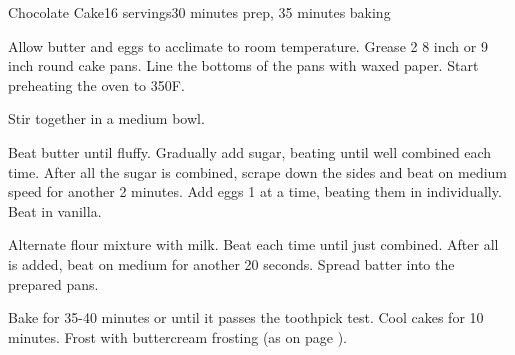 \documentclass[../Cookbook.tex]{subfiles}
\begin{document}
\begin{recipe}{Chocolate Cake}{16 servings}{30 minutes prep, 35 minutes baking}

Allow butter and eggs to acclimate to room temperature. Grease 2 8 inch or 9\X{} inch round cake pans. Line the bottoms of the pans with waxed paper. Start preheating the oven to 350\0F.

Stir together in a medium bowl.

Beat butter until fluffy. Gradually add sugar, beating until well combined each time. After all the sugar is combined, scrape down the sides and beat on medium speed for another 2 minutes. Add eggs 1 at a time, beating them in individually. Beat in vanilla.

Alternate flour mixture with milk. Beat each time until just combined. After all is added, beat on medium for another 20 seconds. Spread batter into the prepared pans.

\newstep
Bake for 35-40 minutes or until it passes the toothpick test. Cool cakes for 10 minutes. Frost with buttercream frosting (as on page \pageref{buttercream}).

\end{recipe}
\end{document}
